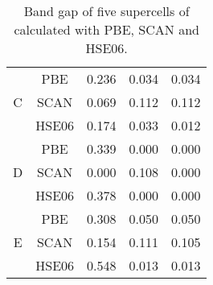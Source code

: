 \begin{table}[H]
\begin{tabular}{@{}ccccc@{}}
\multicolumn{1}{c|}{\multirow{3}{*}{C}} & PBE           & 0.236                                                           & 0.034                                                           & 0.034                                                            \\
\multicolumn{1}{c|}{}                   & SCAN          & 0.069                                                           & 0.112                                                           & 0.112                                                            \\
\multicolumn{1}{c|}{}                   & HSE06         & 0.174                                                           & 0.033                                                           & 0.012                                                            \\ \midrule
\multicolumn{1}{c|}{\multirow{3}{*}{D}} & PBE           & 0.339                                                           & 0.000                                                                & 0.000                                                                 \\
\multicolumn{1}{c|}{}                   & SCAN          & 0.000                                                                & 0.108                                                           & 0.000                                                                 \\
\multicolumn{1}{c|}{}                   & HSE06         & 0.378                                                           & 0.000                                                                & 0.000                                                                 \\ \midrule
\multicolumn{1}{c|}{\multirow{3}{*}{E}} & PBE           & 0.308                                                           & 0.050                                                           & 0.050                                                            \\
\multicolumn{1}{c|}{}                   & SCAN          & 0.154                                                           & 0.111                                                           & 0.105                                                            \\
\multicolumn{1}{c|}{}                   & HSE06         & 0.548                                                           & 0.013                                                           & 0.013                                                            \\ \bottomrule
\end{tabular}
\caption{Band gap of five supercells of  calculated with PBE, SCAN and HSE06.}
\end{table}

